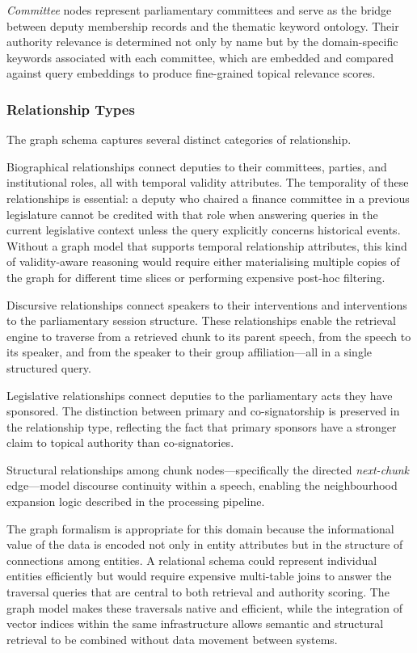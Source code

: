 \textit{Committee} nodes represent parliamentary committees and serve as the bridge between
deputy membership records and the thematic keyword ontology. Their authority relevance is
determined not only by name but by the domain-specific keywords associated with each
committee, which are embedded and compared against query embeddings to produce fine-grained
topical relevance scores.

\subsubsection{Relationship Types}

The graph schema captures several distinct categories of relationship.

Biographical relationships connect deputies to their committees, parties, and institutional
roles, all with temporal validity attributes. The temporality of these relationships is
essential: a deputy who chaired a finance committee in a previous legislature cannot be
credited with that role when answering queries in the current legislative context unless
the query explicitly concerns historical events. Without a graph model that supports
temporal relationship attributes, this kind of validity-aware reasoning would require
either materialising multiple copies of the graph for different time slices or performing
expensive post-hoc filtering.

Discursive relationships connect speakers to their interventions and interventions to the
parliamentary session structure. These relationships enable the retrieval engine to
traverse from a retrieved chunk to its parent speech, from the speech to its speaker, and
from the speaker to their group affiliation---all in a single structured query.

Legislative relationships connect deputies to the parliamentary acts they have sponsored.
The distinction between primary and co-signatorship is preserved in the relationship type,
reflecting the fact that primary sponsors have a stronger claim to topical authority than
co-signatories.

Structural relationships among chunk nodes---specifically the directed \textit{next-chunk}
edge---model discourse continuity within a speech, enabling the neighbourhood expansion
logic described in the processing pipeline.

The graph formalism is appropriate for this domain because the informational value of the
data is encoded not only in entity attributes but in the structure of connections among
entities. A relational schema could represent individual entities efficiently but would
require expensive multi-table joins to answer the traversal queries that are central to
both retrieval and authority scoring. The graph model makes these traversals native and
efficient, while the integration of vector indices within the same infrastructure allows
semantic and structural retrieval to be combined without data movement between systems.

